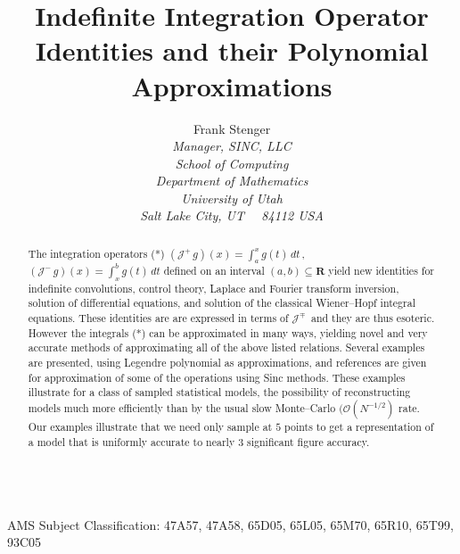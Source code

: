 \documentclass[11pt]{article}
\begin{document}
%
\title{\huge Indefinite Integration Operator Identities and their
  Polynomial Approximations}

\author{{Frank Stenger}
\\{\sl Manager, SINC, LLC}
\\{\sl School of Computing}
\\{\sl Department of Mathematics}
\\{\sl University of Utah}
\\{\sl Salt Lake City, UT \ \ 84112 USA}}



\maketitle

\begin{abstract}
  \noindent The integration operators (*) $({\mathcal J}^+\,g)(x) =
  \int_a^x g(t) \, dt$\,, $({\mathcal J}^-\,g)(x) = \int_x^b g(t) \,
  dt$ defined on an interval $(a,b) \subseteq {\mathbf R}$ yield new
  identities for indefinite convolutions, control theory, Laplace and
  Fourier transform inversion, solution of differential equations, and
  solution of the classical Wiener--Hopf integral equations.  These
  identities are are expressed in terms of ${\mathcal J}^\mp$\, and
  they are thus esoteric.  However the integrals (*) can be
  approximated in many ways, yielding novel and very accurate methods
  of approximating all of the above listed relations.  Several
  examples are presented, using Legendre polynomial as approximations,
  and references are given for approximation of some of the operations
  using Sinc methods.  These examples illustrate for a class of
  sampled statistical models, the possibility of reconstructing models
  much more efficiently than by the usual slow Monte--Carlo
  $({\mathcal O}(N^{-1/2})$ rate.  Our examples illustrate that we
  need only sample at $5$ points to get a representation of a model
  that is uniformly accurate to nearly $3$ significant figure
  accuracy.
  \end{abstract}

\vspace{.2in} \\ AMS Subject Classification: 47A57, 47A58, 65D05,
65L05, 65M70, 65R10, 65T99, 93C05
\end{document}
